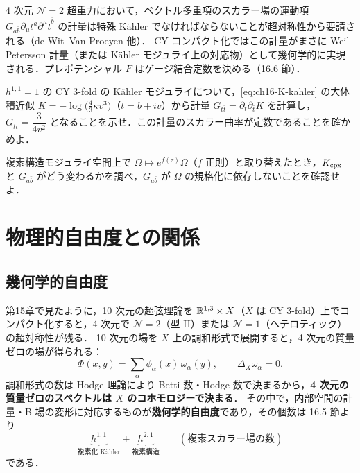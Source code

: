 \begin{physbox}[特殊幾何と $\mathcal{N}=2$ 超重力]
4 次元 $\mathcal{N}=2$ 超重力において，ベクトル多重項のスカラー場の運動項 $G_{a\bar b}\partial_\mu t^a\partial^\mu\bar t^{\bar b}$ の計量は特殊 K\"ahler でなければならないことが超対称性から要請される（de Wit--Van Proeyen 他）．
CY コンパクト化ではこの計量がまさに Weil--Petersson 計量（または K\"ahler モジュライ上の対応物）として幾何学的に実現される．プレポテンシャル $F$ はゲージ結合定数を決める（16.6 節）．
\end{physbox}

$h^{1,1}=1$ の CY 3-fold の K\"ahler モジュライについて，\eqref{eq:ch16-K-kahler} の大体積近似 $K=-\log\bigl(\tfrac43\kappa v^3\bigr)$（$t=b+iv$）から計量 $G_{t\bar t}=\partial_t\partial_{\bar t}K$ を計算し，$G_{t\bar t}=\dfrac{3}{4v^2}$ となることを示せ．この計量のスカラー曲率が定数であることを確かめよ．

複素構造モジュライ空間上で $\Omega\mapsto e^{f(z)}\Omega$（$f$ 正則）と取り替えたとき，$K_{\rm cpx}$ と $G_{a\bar b}$ がどう変わるかを調べ，$G_{a\bar b}$ が $\Omega$ の規格化に依存しないことを確認せよ．

\section{物理的自由度との関係}

\subsection{幾何学的自由度}

第15章で見たように，10 次元の超弦理論を $\mathbb{R}^{1,3}\times X$（$X$ は CY 3-fold）上でコンパクト化すると，4 次元で $\mathcal{N}=2$（型 II）または $\mathcal{N}=1$（ヘテロティック）の超対称性が残る．
10 次元の場を $X$ 上の調和形式で展開すると，4 次元の質量ゼロの場が得られる：
\[
\Phi(x,y)=\sum_\alpha\phi_\alpha(x)\,\omega_\alpha(y),\qquad \Delta_X\omega_\alpha=0 .
\]
調和形式の数は Hodge 理論により Betti 数・Hodge 数で決まるから，\textbf{4 次元の質量ゼロのスペクトルは $X$ のコホモロジーで決まる}．
その中で，内部空間の計量・B 場の変形に対応するものが\textbf{幾何学的自由度}であり，その個数は 16.5 節より
\[
\underbrace{h^{1,1}}_{\text{複素化 K\"ahler}}+\underbrace{h^{2,1}}_{\text{複素構造}}\qquad(\text{複素スカラー場の数})
\]
である．

